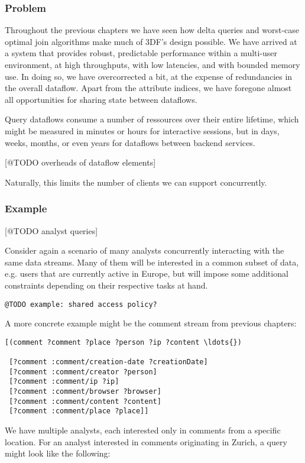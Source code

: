 \documentclass[../catalog.tex]{subfiles}
\begin{document}
\subsubsection{Problem}

Throughout the previous chapters we have seen how delta queries and
worst-case optimal join algorithms make much of 3DF's design
possible. We have arrived at a system that provides robust,
predictable performance within a multi-user environment, at high
throughputs, with low latencies, and with bounded memory use. In doing
so, we have overcorrected a bit, at the expense of redundancies in the
overall dataflow. Apart from the attribute indices, we have foregone
almost all opportunities for sharing state between dataflows.

Query dataflows consume a number of ressources over their entire
lifetime, which might be measured in minutes or hours for interactive
sessions, but in days, weeks, months, or even years for dataflows
between backend services.

[@TODO overheads of dataflow elements]

Naturally, this limits the number of clients we can support
concurrently.

\subsubsection{Example}

[@TODO analyst queries]

Consider again a scenario of many analysts concurrently interacting
with the same data streams. Many of them will be interested in a
common subset of data, e.g. users that are currently active in Europe,
but will impose some additional constraints depending on their
respective tasks at hand.

\texttt{@TODO example: shared access policy?}

A more concrete example might be the comment stream from previous
chapters:

\begin{verbatim}
[(comment ?comment ?place ?person ?ip ?content \ldots{})

 [?comment :comment/creation-date ?creationDate]
 [?comment :comment/creator ?person]
 [?comment :comment/ip ?ip]
 [?comment :comment/browser ?browser]
 [?comment :comment/content ?content]
 [?comment :comment/place ?place]]
\end{verbatim}

We have multiple analysts, each interested only in comments from a
specific location. For an analyst interested in comments originating
in Zurich, a query might look like the following:
\end{document}
